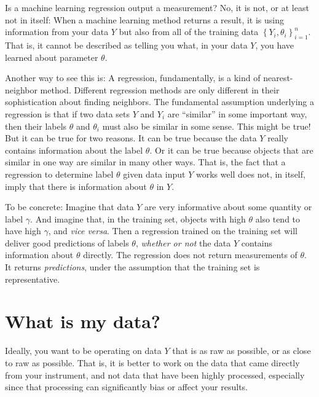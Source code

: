 \documentclass{article}
\newcommand{\foreign}[1]{\textsl{#1}}
\newcommand{\setof}[1]{\left\{{#1}\right\}}
\begin{document}
Is a machine learning regression output a measurement?
No, it is not, or at least not in itself:
When a machine learning method returns a result, it is using information from your data $Y$
but also from all of the training data $\setof{Y_i, \theta_i}_{i=1}^n$.
That is, it cannot be described as telling you what, in your data $Y$, you have learned about parameter $\theta$.

Another way to see this is:
A regression, fundamentally, is a kind of nearest-neighbor method.
Different regression methods are only different in their sophistication about finding neighbors.
The fundamental assumption underlying a regression is that if two data sets $Y$ and $Y_i$ are ``similar'' in some important way, then their labels $\theta$ and $\theta_i$ must also be similar in some sense.
This might be true!
But it can be true for two reasons.
It can be true because the data $Y$ really contains information about the label $\theta$.
Or it can be true because objects that are similar in one way are similar in many other ways.
That is, the fact that a regression to determine label $\theta$ given data input $Y$ works well does not, in itself, imply that there is information about $\theta$ in $Y$.

To be concrete: Imagine that data $Y$ are very informative about some quantity or label $\gamma$.
And imagine that, in the training set, objects with high $\theta$ also tend to have high $\gamma$, and \foreign{vice versa}.
Then a regression trained on the training set will deliver good predictions of labels $\theta$, \emph{whether or not} the data $Y$ contains information about $\theta$ directly.
The regression does not return measurements of $\theta$.
It returns \emph{predictions}, under the assumption that the training set is representative.

\section{What is my data?}\label{sec:data}
Ideally, you want to be operating on data $Y$ that is as raw as possible, or as close to raw as possible.
That is, it is better to work on the data that came directly from your instrument, and not data that have been highly processed, especially since that processing can significantly bias or affect your results.
\end{document}
